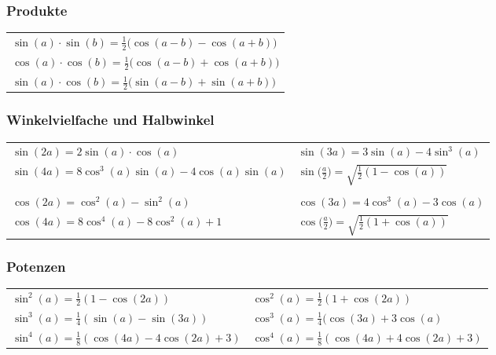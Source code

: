 \subsubsection{Produkte}

\begin{tabular}{l}
    $\sin(a) \cdot \sin(b) = \frac{1}{2} \big( \cos(a-b) - \cos(a+b) \big) $    \\
    $\cos(a) \cdot \cos(b) = \frac{1}{2} \big( \cos(a-b) + \cos(a+b) \big) $    \\	
    $\sin(a) \cdot \cos(b) = \frac{1}{2} \big( \sin(a-b) + \sin(a+b) \big) $ 
\end{tabular}

    
\subsubsection{Winkelvielfache und Halbwinkel}

\begin{tabular}{ll}
    $\sin(2a) = 2 \sin(a) \cdot \cos(a)$                                 & $\sin(3a) = 3 \sin(a) -4 \sin^3(a)$                                 \\
    $\sin(4a) = 8 \cos^3(a)  \sin(a) - 4 \cos(a)  \sin(a)$  & $\sin \big( \frac{a}{2} \big) = \sqrt{\frac{1}{2}(1-\cos(a))}$            \\
    \\
    $\cos(2a) = \cos^2(a) - \sin^2(a)$                                      & $\cos(3a) = 4 \cos^3(a) -3 \cos(a)$                                 \\
    $\cos(4a) = 8 \cos^4(a) - 8 \cos^2(a) + 1$                        & $\cos \big( \frac{a}{2} \big) = \sqrt{\frac{1}{2}(1+\cos(a))}$
\end{tabular}


\subsubsection{Potenzen}

\begin{tabular}{ll}
    $\sin^2(a) = \frac{1}{2}(1-\cos(2a))$                   & $\cos^2(a) = \frac{1}{2}(1+\cos(2a))$                 \\	
    $\sin^3(a) = \frac{1}{4}( \sin(a) - \sin(3a))$       & $\cos^3(a) = \frac{1}{4}(\cos(3a) + 3 \cos(a)$     \\	
    $\sin^4(a) = \frac{1}{8}(\cos(4a) -4 \cos(2a) +3)$   & $\cos^4(a) = \frac{1}{8}(\cos(4a) +4 \cos(2a) +3)$ 	
\end{tabular}

